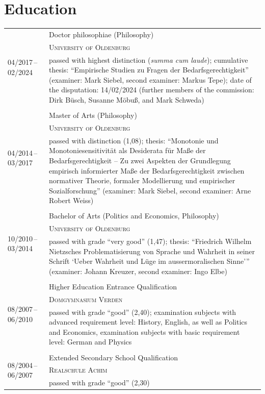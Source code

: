 \documentclass[a4paper,10pt]{article}
\begin{document}
\section{Education}
\begin{longtable}{p{2.5cm}p{11cm}}
\multirow{3}{2.5cm}{\footnotesize{04/2017\,--\,02/2024}} & Doctor philosophiae (Philosophy)\\
& \textsc{University of Oldenburg}\\
& \footnotesize{passed with highest distinction (\textit{summa cum laude}); cumulative thesis: \enquote{Empirische Studien zu Fragen der Bedarfsgerechtigkeit} (examiner: Mark Siebel, second examiner: Markus Tepe); date of the disputation: 14/02/2024 (further members of the commission: Dirk Büsch, Susanne Möbuß, and Mark Schweda)}\\
\\
\multirow{3}{2.5cm}{\footnotesize{04/2014\,--\,03/2017}} & Master of Arts (Philosophy)\\
& \textsc{University of Oldenburg}\\
& \footnotesize{passed with distinction (1,08); thesis: \enquote{Monotonie und Monotoniesensitivität als Desiderata für Maße der Bedarfsgerechtigkeit -- Zu zwei Aspekten der Grundlegung empirisch informierter Maße der Bedarfsgerechtigkeit zwischen normativer Theorie, formaler Modellierung und empirischer Sozialforschung} (examiner: Mark Siebel, second examiner: Arne Robert Weiss)}\\
\\
\multirow{3}{2.5cm}{\footnotesize{10/2010\,--\,03/2014}} & Bachelor of Arts (Politics and Economics, Philosophy)\\
& \textsc{University of Oldenburg}\\
& \footnotesize{passed with grade \enquote{very good} (1,47); thesis: \enquote{Friedrich Wilhelm Nietzsches Problematisierung von Sprache und Wahrheit in seiner Schrift \enquote{Ueber Wahrheit und Lüge im aussermoralischen Sinne}} (examiner: Johann Kreuzer, second examiner: Ingo Elbe)}\\
\\
\multirow{3}{2.5cm}{\footnotesize{08/2007\,--\,06/2010}} & Higher Education Entrance Qualification\\
& \textsc{Domgymnasium Verden}\\
& \footnotesize{passed with grade \enquote{good} (2,40); examination subjects with advanced requirement level: History, English, as well as Politics and Economics, examination subjects with basic requirement level: German and Physics}\\
\\
\multirow{3}{2.5cm}{\footnotesize{08/2004\,--\,06/2007}} & Extended Secondary School Qualification\\
& \textsc{Realschule Achim}\\
& \footnotesize{passed with grade \enquote{good} (2,30)}\\
\end{longtable}
\end{document}
